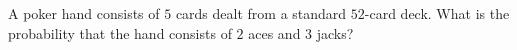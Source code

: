 A poker hand consists of $5$ cards dealt from a standard $52$-card deck. What is the probability that the hand consists of $2$ aces and $3$ jacks?
